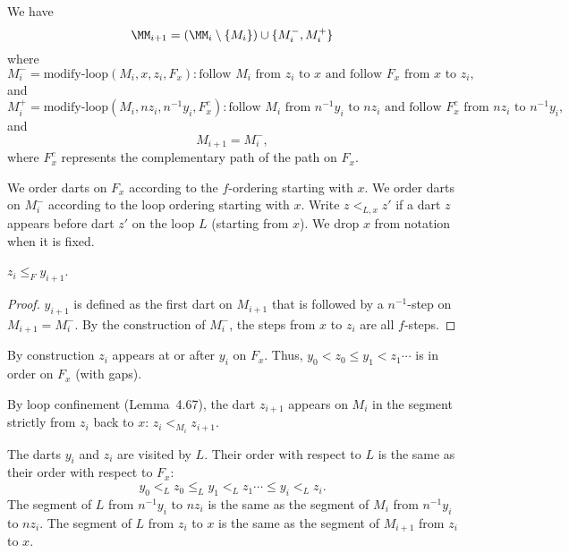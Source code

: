 \begin{lemma} 
We have 
\[
\MM_{i+1} = (\MM_i \setminus \{M_i\}) \cup \{M_i^-,M_i^+\}
\]
where 
\[
M_i^- = \text{modify-loop} (M_i,x,z_i,F_x): 
  \text{follow } M_i \text{ from } z_i \text{ to } x
  \text{ and follow } F_x \text{ from } x \text{ to } z_i,
\]
and
\[
M_i^+ = \text{modify-loop} (M_i,nz_i,n^{-1}y_i,F^c_x): 
\text{follow } M_i \text{ from } n^{-1} y_i \text{ to } n z_i
  \text{ and follow } F^c_x \text{ from } nz_i \text{ to } n^{-1} y_i,
\]
and 
\[
M_{i+1} = M_i^-,
\]
where $F^c_x$ represents the complementary path of the path on $F_x$.
\end{lemma} 

We order darts on $F_x$ according to the $f$-ordering starting with $x$.
We order darts on $M_i^-$ 
according to the loop ordering starting with $x$.
Write $z <_{L,x} z'$ if a dart $z$ appears before dart $z'$ on the loop $L$
(starting from $x$).  We drop $x$ from notation when it is fixed.



















\begin{lemma}  $z_i \le _F y_{i+1}$.
\end{lemma} 

\begin{proof} $y_{i+1}$ is defined as the first dart on $M_{i+1}$
that is followed by a $n^{-1}$-step on $M_{i+1} = M_i^-$.  By the
construction of $M_i^-$,
the steps from $x$ to $z_i$ are all $f$-steps.
\end{proof}

By construction $z_i$ appears at or after $y_i$ on $F_x$.  Thus,
$y_0 < z_0 \le y_1 < z_1\cdots$ is in order on $F_x$ (with gaps).

By loop confinement (Lemma~4.67), the dart $z_{i+1}$ appears on
$M_i$ in the segment strictly from $z_i$ back to $x$:
$z_i <_{M_i} z_{i+1}$.

\begin{lemma} 
The darts $y_i$ and $z_i$ are visited by $L$.  Their order with
respect to $L$ is the same as their order with respect to $F_x$:
\[
y_0 <_L z_0 \le_L y_1 <_L z_1\cdots \le y_i <_L z_i.
\]
The segment of $L$ from $n^{-1} y_i$ to $n z_i$ is the same
as the segment of $M_i$ from $n^{-1}y_i$ to $n z_i$.
The segment of $L$ from $z_i$ to $x$ is the same as the
segment of $M_{i+1}$ from $z_i$ to $x$.
\end{lemma} 

